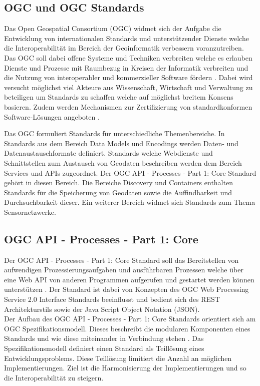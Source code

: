 \subsection{OGC und OGC Standards}
Das Open Geospatial Consortium (OGC) widmet sich der Aufgabe die Entwicklung von internationalen Standards und unterstützender Dienste welche die Interoperabilität im 
Bereich der Geoinformatik verbessern voranzutreiben. Das OGC soll dabei offene Systeme und Techniken verbreiten welche es erlauben Dienste und Prozesse mit Raumbezug
in Kreisen der Informatik verbreiten und die Nutzung von interoperabler und kommerzieller Software fördern \cite{ogc_bylaws}. Dabei wird versucht möglichst viel
Akteure aus Wissenschaft, Wirtschaft und Verwaltung zu beteiligen um Standards zu schaffen welche auf möglichst breitem Konsens basieren. Zudem werden 
Mechanismen zur Zertifizierung von standardkonformen Software-Lösungen angeboten \cite{ogc_bylaws}.

Das OGC formuliert Standards für unterschiedliche Themenbereiche. In Standards aus dem Bereich Data Models und Encodings werden Daten- und Datenaustauschformate
definiert. Standards welche Webdienste und Schnittstellen zum Austausch von Geodaten beschreiben werden dem Bereich Services und APIs zugeordnet. 
Der OGC API - Processes - Part 1: Core Standard gehört in diesen Bereich. Die Bereiche Discovery und Containers enthalten Standards für die Speicherung von Geodaten
sowie die Auffindbarkeit und Durchsuchbarkeit dieser. Ein weiterer Bereich widmet sich Standards zum Thema Sensornetzwerke.

\subsection{OGC API - Processes - Part 1: Core}
Der OGC API - Processes - Part 1: Core Standard soll das Bereitstellen von aufwendigen Prozessierungsaufgaben und ausführbaren Prozessen welche über eine Web API
 von anderen Programmen aufgerufen und gestartet werden können unterstützen \cite{ogc_api_processes_core}. Der Standard ist dabei von Konzepten des 
OGC Web Processing Service 2.0 Interface Standards beeinflusst und bedient sich des REST Architekturstils sowie der Java Script Object Notation (JSON). \\

Der Aufbau des OGC API - Processes - Part 1: Core Standards orientiert sich am OGC Spezifikationsmodell. Dieses beschreibt die modularen Komponenten eines Standards und 
wie diese miteinander in Verbindung stehen \cite{ogc_specification_model}. 
Das Spezifikationsmodell definiert einen Standard als Teillösung eines Entwicklungsproblems.
Diese Teillösung limitiert die Anzahl an möglichen Implementierungen. Ziel ist die Harmonisierung der Implementierungen und so die Interoperabilität zu steigern.

